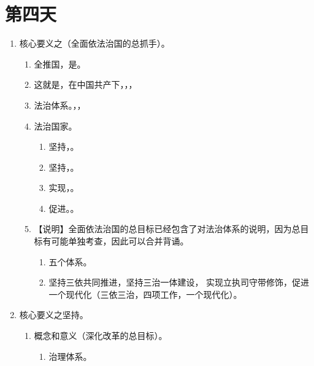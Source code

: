 \section{第四天}
\begin{enumerate}
  \item 核心要义之（全面依法治国的总抓手）。
        \begin{enumerate}
          \item 全推国，是。
          \item 这就是，在中国共产下，，，
          \item 法治体系。，，
          \item 法治国家。
                \begin{enumerate}
                  \item 坚持，。
                  \item 坚持，。
                  \item 实现，。
                  \item 促进。。
                \end{enumerate}
          \item 【说明】全面依法治国的总目标已经包含了对法治体系的说明，因为总目标有可能单独考查，因此可以合并背诵。
                \begin{enumerate}
                  \item {}五个体系。
                  \item {}坚持三依共同推进，坚持三治一体建设，
                        实现立执司守带修饰，促进一个现代化（三依三治，四项工作，一个现代化）。
                \end{enumerate}
        \end{enumerate}
  \item 核心要义之坚持。
        \begin{enumerate}
          \item 概念和意义（深化改革的总目标）。
                \begin{enumerate}
                  \item 治理体系。

\end{enumerate}
\end{enumerate}
\end{enumerate}
